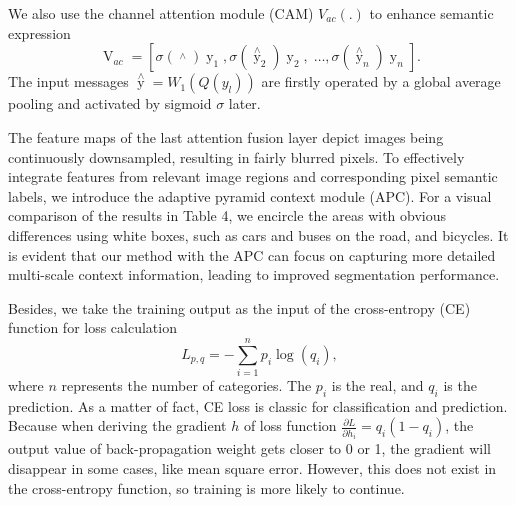 \documentclass[journal,twoside,web]{ieeecolor}
\begin{document}
We also use the channel attention module (CAM) ${V_{ac}}\left( . \right)$ to enhance semantic expression
\begin{equation}
	\mathop V\nolimits_{ac}  = \left[ {\sigma \left( {\mathop {{y_1}}\limits^ \wedge  } \right)\mathop y\nolimits_1 ,\sigma \left( {{{\mathop y\limits^ \wedge  }_2}} \right)\mathop y\nolimits_2 ,\; \ldots ,\sigma \left( {{{\mathop y\limits^ \wedge  }_n}} \right)\mathop y\nolimits_n } \right].
\end{equation}
The input messages $\mathop y\limits^ \wedge   = {W_1}\left( {Q\left( {{y_l}} \right)} \right)$ are firstly operated by a global average pooling and activated by sigmoid $\sigma$ later. 


The feature maps of the last attention fusion layer depict images being continuously downsampled, resulting in fairly blurred pixels. To effectively integrate features from relevant image regions and corresponding pixel semantic labels, we introduce the adaptive pyramid context module (APC). For a visual comparison of the results in Table 4, we encircle the areas with obvious differences using white boxes, such as cars and buses on the road, and bicycles. It is evident that our method with the APC can focus on capturing more detailed multi-scale context information, leading to improved segmentation performance. 

Besides, we take the training output as the input of the cross-entropy (CE) function for loss calculation
\begin{equation}
{L_{p,q}} =  - \sum\limits_{i = 1}^n {{p_i}} \log \left( {{q_i}} \right),
\end{equation}
where $n$ represents the number of categories. The ${p_i}$ is the real, and ${q_i}$ is the prediction. As a matter of fact, CE loss is classic for classification and prediction. Because when deriving the gradient ${h}$ of loss function ${\frac{{\partial L}}{{\partial {h_i}}} = {q_i}\left( {1 - {q_i}} \right)}$, the output value of back-propagation weight gets closer to 0 or 1, the gradient will disappear in some cases, like mean square error. However, this does not exist in the cross-entropy function, so training is more likely to continue.
\end{document}
